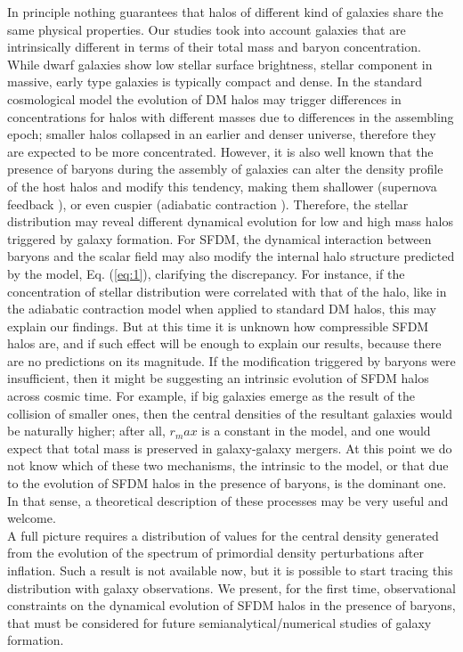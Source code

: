\documentclass[8pt,letterpaper,twocolumn]{article}
\begin{document}
\begin{multicols}{2}
In principle nothing guarantees that halos of different kind of galaxies share the same physical properties. Our studies took into account galaxies that are intrinsically different in terms of their total mass and baryon concentration. While dwarf galaxies show low stellar surface brightness, stellar component in massive, early type galaxies is typically compact and dense.
In the standard cosmological model the evolution of DM halos may trigger differences in concentrations for halos with different masses due to differences in the assembling epoch; smaller halos collapsed in an earlier and denser universe, therefore they are expected to be more concentrated. However, it is also well known that the presence of baryons during the assembly of galaxies can alter the density profile of the host halos and modify this tendency, making them shallower (supernova feedback \cite{Ceverino_2009}), or even cuspier (adiabatic contraction \cite{Ceverino_2009}). Therefore, the stellar distribution may reveal different dynamical evolution for low and high mass halos triggered by galaxy formation.
For SFDM, the dynamical interaction between baryons and the scalar field may also modify the internal halo structure predicted by the model, Eq. (\ref{eq:1}), clarifying the discrepancy. For instance, if the concentration of stellar distribution were correlated with that of the halo, like in the adiabatic contraction model when applied to standard DM halos, this may explain our findings. But at this time it is unknown how compressible SFDM halos are, and if such effect will be enough to explain our results, because there are no predictions on its magnitude. If the modification triggered by baryons were insufficient, then it might be suggesting an intrinsic evolution of SFDM halos across cosmic time. For example, if big galaxies emerge as the result of the collision of smaller ones, then the central densities of the resultant galaxies would be naturally higher; after all, $r_max$ is a constant in the model, and one would expect that total mass is preserved in galaxy-galaxy mergers. At this point we do not know which of these two mechanisms, the intrinsic to the model, or that due to the evolution of SFDM halos in the presence of baryons, is the dominant one. In that sense, a theoretical description of these processes may be very useful and welcome.\\

A full picture requires a distribution of values for the central density generated from the evolution of the spectrum of primordial density perturbations after inflation. Such a result is not available now, but it is possible to start tracing this distribution with galaxy observations. We present, for the first time, observational constraints on the dynamical evolution of SFDM halos in the presence of baryons, that must be considered for future semianalytical/numerical studies of galaxy formation.


\end{multicols}
\end{document}
